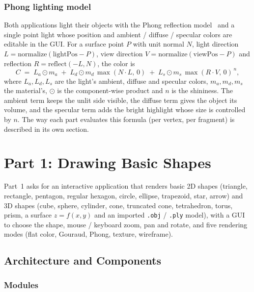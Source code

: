 \documentclass[a4paper, 11pt]{article}
\newcommand{\code}[1]{\texttt{#1}}
\begin{document}
\subsubsection{Phong lighting model}\label{sec:phong}
Both applications light their objects with the Phong reflection model~\cite{phong} and a single point light whose position and ambient / diffuse / specular colors are
editable in the GUI. For a surface point $P$ with unit normal $N$, light direction $L=\mathrm{normalize}(\text{lightPos}-P)$, view direction
$V=\mathrm{normalize}(\text{viewPos}-P)$ and reflection $R=\mathrm{reflect}(-L,N)$, the color is
\[
  C \;=\; L_a\odot m_a \;+\; L_d\odot m_d\,\max(N\!\cdot\!L,\,0) \;+\; L_s\odot m_s\,\max(R\!\cdot\!V,\,0)^{\,n},
\]
where $L_a,L_d,L_s$ are the light's ambient, diffuse and specular colors, $m_a,m_d,m_s$ the material's, $\odot$ is the component-wise product and $n$ is the shininess.
The ambient term keeps the unlit side visible, the diffuse term gives the object its volume, and the specular term adds the bright highlight whose size is controlled by $n$.
The way each part evaluates this formula (per vertex, per fragment) is described in its own section.

\section{Part 1: Drawing Basic Shapes}\label{sec:part1}

Part~1 asks for an interactive application that renders basic 2D shapes (triangle, rectangle, pentagon, regular hexagon, circle, ellipse, trapezoid, star, arrow)
and 3D shapes (cube, sphere, cylinder, cone, truncated cone, tetrahedron, torus, prism, a surface $z=f(x,y)$ and an imported \code{.obj} / \code{.ply} model),
with a GUI to choose the shape, mouse / keyboard zoom, pan and rotate, and five rendering modes (flat color, Gouraud, Phong, texture, wireframe).

\subsection{Architecture and Components}\label{sec:arch}

\subsubsection{Modules}
\end{document}
